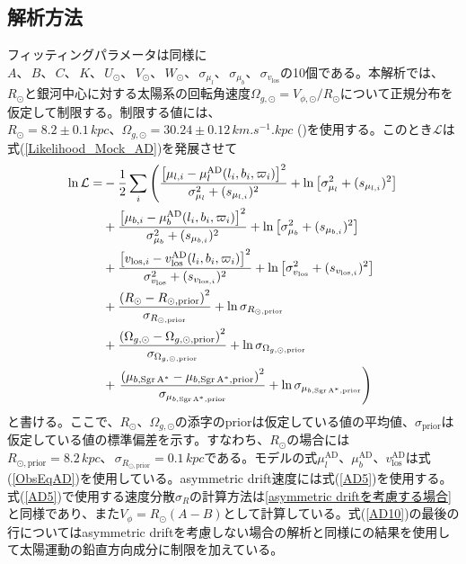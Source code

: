 \subsection{解析方法}
フィッティングパラメータは同様に$A、\,B、\,C、\,K、\,U_{\odot}、\,V_{\odot}、\,W_{\odot}、\,\sigma_{\mu_l}、\,\sigma_{\mu_b}、\,\sigma_{v_{\mathrm{los}}}$の10個である。本解析では、$R_{\odot}$と銀河中心に対する太陽系の回転角速度$\Omega_{g,\odot}=V_{\phi,\odot}/R_{\odot}$について正規分布を仮定して制限する。制限する値には、$R_{\odot}=8.2\pm0.1\,\si{kpc}、\Omega_{g,\odot}=30.24\pm0.12\,\si{km.s^{-1}.kpc}$ (\cite{BH2016})を使用する。このとき$\mathcal{L}$は式(\ref{Likelihood_Mock_AD})を発展させて
\begin{align}
\begin{aligned}
	\ln \mathcal{L} =& -\frac{1}{2}\sum_i \left(\frac{\left[\mu_{l,i} - \mu_l^{\mathrm{AD}}(l_i,b_i,\varpi_i)\right]^2}{\sigma_{\mu_l}^2 + (s_{\mu_{l,i}})^2}  + {\rm ln}\left[\sigma_{\mu_l}^2 + (s_{\mu_{l,i}})^2\right] \right. \\
	&+ \frac{\left[\mu_{b,i} - \mu_b^{\mathrm{AD}}(l_i,b_i,\varpi_i)\right]^2}{\sigma_{\mu_b}^2 + (s_{\mu_{b,i}})^2}  + {\rm ln}\left[\sigma_{\mu_b}^2 + (s_{\mu_{b,i}})^2\right] \\
	&+ \frac{\left[v_{\mathrm{los},i} - v^{\mathrm{AD}}_{\mathrm{los}}(l_i,b_i,\varpi_i)\right]^2}{\sigma_{v_{\mathrm{los}}}^2 + (s_{v_{\mathrm{los},i}})^2} + {\rm ln}\left[\sigma_{v_{\mathrm{los}}}^2 + (s_{v_{\mathrm{los},i}})^2\right]\\
	&+ \frac{\left(R_{\odot} - R_{\odot,\mathrm{prior}}\right)^2}{\sigma_{R_{\odot,\mathrm{prior}}}} + \ln{\sigma_{R_{\odot,\mathrm{prior}}}}\\
	&+ \frac{\left(\Omega_{g,\odot} - \Omega_{g,\odot,\mathrm{prior}}\right)^2}{\sigma_{\Omega_{g,\odot,\mathrm{prior}}}} + \ln{\sigma_{\Omega_{g,\odot,\mathrm{prior}}}}\\
	&+ \left. \frac{\left(\mu_{b,\mathrm{Sgr\,A}^*} - \mu_{b,\mathrm{Sgr\,A}^*,\mathrm{prior}}\right)^2}{\sigma_{\mu_{b,\mathrm{Sgr\,A}^*,\mathrm{prior}}}} + \ln{\sigma_{\mu_{b,\mathrm{Sgr\,A}^*,\mathrm{prior}}}}\right)
\end{aligned} \label{AD10}
\end{align}
と書ける。ここで、$R_{\odot}、\Omega_{g,\odot}$の添字のpriorは仮定している値の平均値、$\sigma_{\mathrm{prior}}$は仮定している値の標準偏差を示す。すなわち、$R_{\odot}$の場合には$R_{\odot,\mathrm{prior}} = 8.2\,\si{kpc}、\,\sigma_{R_{\odot,\mathrm{prior}}}=0.1\,\si{kpc}$である。モデルの式$\mu_l^{\mathrm{AD}}、\mu_b^{\mathrm{AD}}、v^{\mathrm{AD}}_{\mathrm{los}}$は式(\ref{ObsEqAD})を使用している。asymmetric drift速度には式(\ref{AD5})を使用する。式(\ref{AD5})で使用する速度分散$\sigma_R$の計算方法は\ref{asymmetric driftを考慮する場合}と同様であり、また$V_{\phi} = R_{\odot}(A-B)$として計算している。式(\ref{AD10})の最後の行についてはasymmetric driftを考慮しない場合の解析と同様に\cite{RB14}の結果を使用して太陽運動の鉛直方向成分に制限を加えている。

